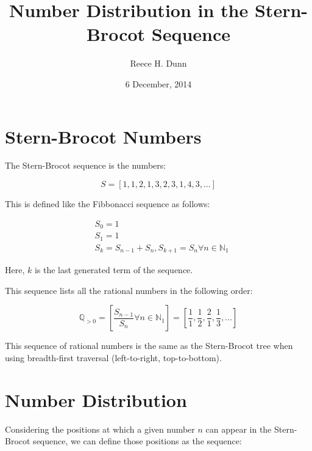 \documentclass{article}
\title{Number Distribution in the Stern-Brocot Sequence}
\date{6 December, 2014}
\author{Reece H. Dunn}
\begin{document}
\maketitle

\section{Stern-Brocot Numbers}

The Stern-Brocot sequence is the numbers:

\begin{displaymath}
S = [1, 1, 2, 1, 3, 2, 3, 1, 4, 3, ...]
\end{displaymath}

\noindent
This is defined like the Fibbonacci sequence as follows:

\begin{displaymath}\begin{aligned}
& S_0 = 1 \\
& S_1 = 1 \\
& S_k = S_{n-1} + S_n, S_{k+1} = S_n \forall n \in \mathbb{N}_1
\end{aligned}\end{displaymath}

\noindent
Here, \begin{math}k\end{math} is the last generated term of the sequence.

\noindent
This sequence lists all the rational numbers in the following order:

\begin{displaymath}
\mathbb{Q}_{>0}
=
\left[
\frac{S_{n-1}}{S_n}
\forall n \in \mathbb{N}_{1}
\right]
=
\left[
\frac{1}{1},
\frac{1}{2},
\frac{2}{1},
\frac{1}{3},
...
\right]
\end{displaymath}

\noindent
This sequence of rational numbers is the same as the Stern-Brocot tree when
using breadth-first traversal (left-to-right, top-to-bottom).

\section{Number Distribution}

Considering the positions at which a given number \begin{math}n\end{math} can
appear in the Stern-Brocot sequence, we can define those positions as the
sequence:
\end{document}
